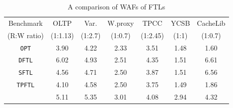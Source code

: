 \setlength{\tabcolsep}{0.33em}
{\renewcommand{\arraystretch}{0.6}
\begin{table}[b]
    \footnotesize
    \centering
    \vspace{-5pt}
    \caption{A comparison of WAFs of FTLs}
    \begin{tabular}{|c||c|c|c|c|c|c|}
        \hline
            Benchmark       &  OLTP & Var. & W.proxy   & TPCC & YCSB    & CacheLib\\ 
                                (R:W ratio)    &  (1:1.13) & (1:2.7)   &(1:0.7)   & (1:2.45)   &(1:1)       & (1:0.7)\\ \hline\hline
            \texttt{OPT}	        & 3.90      & 4.22        & 2.33      &3.51   &1.48   &1.60\\ \hline
            \texttt{DFTL}	        & 6.02      & 4.93        & 2.51      &4.35   &1.51   &6.61\\ \hline
            \texttt{SFTL}	        & 4.56      & 4.71        & 2.50      &3.87   &1.51   &6.56\\ \hline
            \texttt{TPFTL}	        & 4.10      & 4.58        & 2.50      &3.75   &1.49   &1.86\\ \hline
            \texttt{\ours{}}	    & 5.11      & 5.35        & 3.01      &4.08   &2.94   &4.32\\ \hline
    \end{tabular}
    \label{tab:waf}
    \vspace{-5pt}
\end{table}
}

